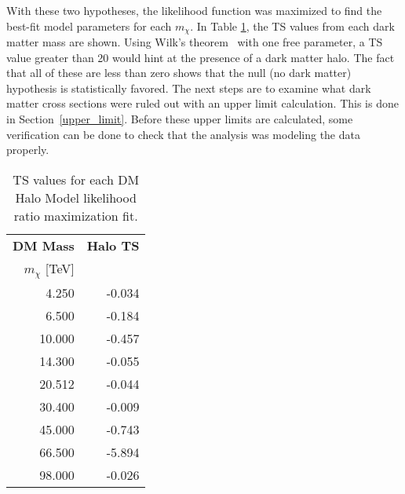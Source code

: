   With these two hypotheses, the likelihood function was maximized to find the best-fit model parameters for each $m_{\chi}$.
  In Table \ref{tab:tsvals}, the TS values from each dark matter mass are shown.
  Using Wilk's theorem~\cite{wilks1938} with one free parameter, a TS value greater than 20 would hint at the presence of a dark matter halo.
  The fact that all of these are less than zero shows that the null (no dark matter) hypothesis is statistically favored.
  The next steps are to examine what dark matter cross sections were ruled out with an upper limit calculation.
  This is done in Section~\ref{upper_limit}.
  Before these upper limits are calculated, some verification can be done to check that the analysis was modeling the data properly.

  \begin{table}[!t]
    \centering
    \begin{tabular}{|r|r|}
      \hline
      \textbf{DM Mass}        & \textbf{Halo TS} \\
      \textbf{$m_\chi$} [TeV] &                  \\
      \hline 
       4.250 & -0.034 \\
       6.500 & -0.184 \\
      10.000 & -0.457 \\
      14.300 & -0.055 \\
      20.512 & -0.044 \\
      30.400 & -0.009 \\
      45.000 & -0.743 \\
      66.500 & -5.894 \\
      98.000 & -0.026 \\

      \hline 
    \end{tabular}
    \caption[DM Halo TS Values]{
      TS values for each DM Halo Model likelihood ratio maximization fit.
    }
    \label{tab:tsvals}
  \end{table}

